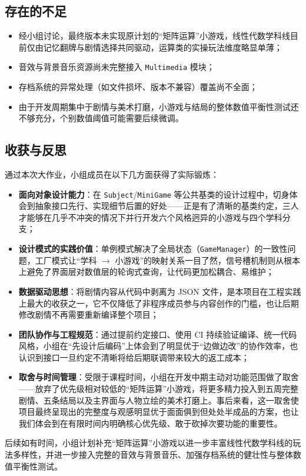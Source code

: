 \documentclass[12pt]{article}
\newcommand{\module}[1]{\texttt{#1}}
\begin{document}
\subsection{存在的不足}
\begin{itemize}[itemsep=2pt]
  \item 经小组讨论，最终版本未实现原计划的“矩阵运算”小游戏，线性代数学科线目前仅由记忆翻牌与剧情选择共同驱动，运算类的实操玩法维度略显单薄；
  \item 音效与背景音乐资源尚未完整接入 \texttt{Multimedia} 模块；
  \item 存档系统的异常处理（如文件损坏、版本不兼容）覆盖尚不全面；
  \item 由于开发周期集中于剧情与美术打磨，小游戏与结局的整体数值平衡性测试还不够充分，个别数值阈值可能需要后续微调。
\end{itemize}

\subsection{收获与反思}
通过本次大作业，小组成员在以下几方面获得了实际锻炼：

\begin{itemize}[itemsep=2pt]
  \item \textbf{面向对象设计能力}：在 \module{Subject}/\module{MiniGame} 等公共基类的设计过程中，切身体会到抽象接口先行、实现细节后置的好处——正是有了清晰的基类约定，三人才能够在几乎不冲突的情况下并行开发六个风格迥异的小游戏与四个学科分支；
  \item \textbf{设计模式的实践价值}：单例模式解决了全局状态（\module{GameManager}）的一致性问题，工厂模式让“学科 $\rightarrow$ 小游戏”的映射关系一目了然，信号槽机制则从根本上避免了界面层对数值层的轮询式查询，让代码更加松耦合、易维护；
  \item \textbf{数据驱动思想}：将剧情内容从代码中剥离为 JSON 文件，是本项目在工程实践上最大的收获之一，它不仅降低了非程序成员参与内容创作的门槛，也让后期修改剧情不再需要重新编译整个项目；
  \item \textbf{团队协作与工程规范}：通过提前约定接口、使用 CI 持续验证编译、统一代码风格，小组在“先设计后编码”上体会到了明显优于“边做边改”的协作效率，也认识到接口一旦约定不清晰将给后期联调带来较大的返工成本；
  \item \textbf{取舍与时间管理}：受限于课程时间，小组在开发中期主动对功能范围做了取舍——放弃了优先级相对较低的“矩阵运算”小游戏，将更多精力投入到五周完整剧情、五条结局以及主界面与人物立绘的美术打磨上。事后来看，这一取舍使项目最终呈现出的完整度与观感明显优于面面俱到但处处半成品的方案，也让我们体会到在有限时间内明确核心优先级、敢于砍掉次要功能的重要性。
\end{itemize}

后续如有时间，小组计划补充“矩阵运算”小游戏以进一步丰富线性代数学科线的玩法多样性，并进一步接入完整的音效与背景音乐、加强存档系统的健壮性与整体数值平衡性测试。
\end{document}
